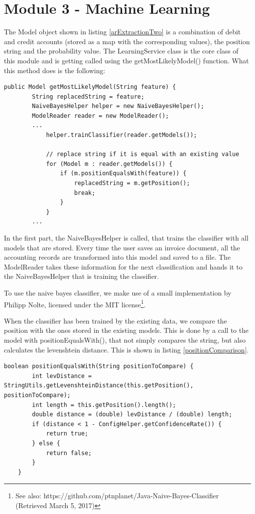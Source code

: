 \section{Module 3 - Machine Learning}
\label{sec5.6}

The Model object shown in listing \ref{arExtractionTwo} is a combination of debit and credit accounts (stored as a map with the corresponding values), the position string and the probability value. The LearningService class is the core class of this module and is getting called using the getMostLikelyModel() function. What this method does is the following:

\begin{lstlisting}[caption={Search for the most likely model}]
 public Model getMostLikelyModel(String feature) {
        String replacedString = feature;
        NaiveBayesHelper helper = new NaiveBayesHelper();
        ModelReader reader = new ModelReader();
        ...
            helper.trainClassifier(reader.getModels());

            // replace string if it is equal with an existing value
            for (Model m : reader.getModels()) {
                if (m.positionEqualsWith(feature)) {
                    replacedString = m.getPosition();
                    break;
                }
            }
		...
\end{lstlisting}

In the first part, the NaiveBayesHelper is called, that trains the classifier with all models that are stored. Every time the user saves an invoice document, all the accounting records are transformed into this model and saved to a file. The ModelReader takes these information for the next classification and hands it to the NaiveBayesHelper that is training the classifier.


To use the naive bayes classifier, we make use of a small implementation by Philipp Nolte, licensed under the MIT license\footnote{See also: https://github.com/ptnplanet/Java-Naive-Bayes-Classifier (Retrieved March 5, 2017)}.

When the classifier has been trained by the existing data, we compare the position with the ones stored in the existing models. This is done by a call to the model with positionEqualsWith(), that not simply compares the string, but also calculates the levenshtein distance. This is shown in listing \ref{positionComparison}.

\begin{lstlisting}[caption={Comparison between positions},label={positionComparison}]
    boolean positionEqualsWith(String positionToCompare) {
        int levDistance = StringUtils.getLevenshteinDistance(this.getPosition(), positionToCompare);
        int length = this.getPosition().length();
        double distance = (double) levDistance / (double) length;
        if (distance < 1 - ConfigHelper.getConfidenceRate()) {
            return true;
        } else {
            return false;
        }
    }
\end{lstlisting}

